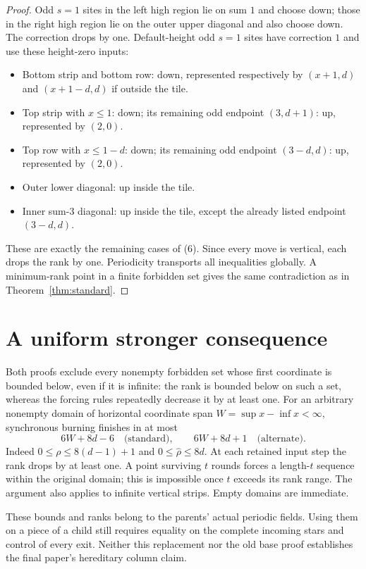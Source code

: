 \documentclass[11pt]{article}
\begin{document}
\begin{proof}
Odd $s=1$ sites in the left high region lie on sum $1$ and choose
down; those in the right high region lie on the outer upper diagonal
and also choose down. The correction drops by one. Default-height
odd $s=1$ sites have correction $1$ and use these height-zero inputs:
\begin{itemize}
\item Bottom strip and bottom row: down, represented respectively by
$(x+1,d)$ and $(x+1-d,d)$ if outside the tile.
\item Top strip with $x\le1$: down; its remaining odd endpoint
$(3,d+1)$: up, represented by $(2,0)$.
\item Top row with $x\le1-d$: down; its remaining odd endpoint
$(3-d,d)$: up, represented by $(2,0)$.
\item Outer lower diagonal: up inside the tile.
\item Inner sum-$3$ diagonal: up inside the tile, except the already
listed endpoint $(3-d,d)$.
\end{itemize}
These are exactly the remaining cases of (6). Since every move is
vertical, each drops the rank by one. Periodicity transports all
inequalities globally. A minimum-rank point in a finite forbidden set
gives the same contradiction as in Theorem~\ref{thm:standard}.
\end{proof}

\section*{A uniform stronger consequence}
Both proofs exclude every nonempty forbidden set whose first coordinate
is bounded below, even if it is infinite: the rank is bounded below on
such a set, whereas the forcing rules repeatedly decrease it by at
least one. For an arbitrary nonempty domain of horizontal coordinate span
$W=\sup x-\inf x<\infty$,
synchronous burning finishes in at most
\[
 6W+8d-6\quad\text{(standard)},\qquad
 6W+8d+1\quad\text{(alternate)}.                               \tag{9}
\]
Indeed $0\le\rho\le8(d-1)+1$ and $0\le\widehat\rho\le8d$.
At each retained input step the rank drops by at least one. A point
surviving $t$ rounds forces a length-$t$ sequence within the original
domain; this is impossible once $t$ exceeds its rank range. The argument
also applies to infinite vertical strips. Empty domains are immediate.

These bounds and ranks belong to the parents' actual periodic fields.
Using them on a piece of a child still requires equality on the complete
incoming stars and control of every exit. Neither this replacement nor
the old base proof establishes the final paper's hereditary column claim.
\end{document}
